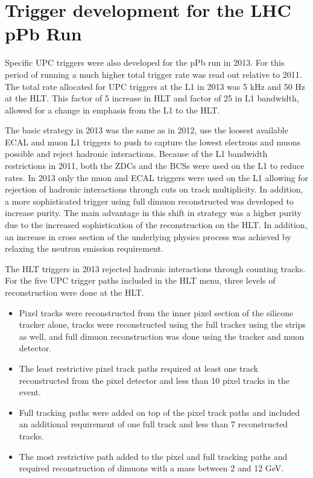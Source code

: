  \section{\label{sec:pPbTrigDev}Trigger development for the LHC pPb Run}
   Specific UPC triggers were also developed for the pPb run in 2013. 
    For this period of running a much higher total trigger rate was read out 
      relative to 2011.
    The total rate allocated for UPC triggers at the L1 in 2013 was 5 kHz and 
      50 Hz at the HLT.
    This factor of 5 increase in HLT and factor of 25 in L1 bandwidth,
      allowed for a change in emphasis from the L1 to the HLT. 

    The basic strategy in 2013 was the same as in 2012, use the loosest 
      available ECAL and muon L1 triggers to push to capture the lowest \pt{}
      electrons and muons possible and reject hadronic interactions.
    Because of the L1 bandwidth restrictions in 2011, both the ZDCs and the 
      BCSs were used on the L1 to reduce rates.
    In 2013 only the muon and ECAL triggers were used on the L1 allowing for 
      rejection of hadronic interactions through cuts on track multiplicity. 
    In addition, a more sophisticated trigger using full dimuon reconstructed 
      was developed to increase purity.
    The main advantage in this shift in strategy was a higher purity due to 
      the increased sophistication of the reconstruction on the HLT.
    In addition, an increase in cross section of the underlying physics process
      was achieved by relaxing the neutron emission requirement.

    The HLT triggers in 2013 rejected hadronic interactions through counting
      tracks. 
    For the five UPC trigger paths included in the HLT menu, 
      three levels of reconstruction were done at the HLT.

    \begin{itemize}
      \item Pixel tracks were reconstructed from the inner pixel section of the 
        silicone tracker alone, tracks were reconstructed using the full
        tracker using the strips as well, and full dimuon reconstruction was 
        done using the tracker and muon detector. 
      \item The least restrictive pixel track paths required at least 
        one track reconstructed from the pixel detector and less than 10 pixel 
        tracks in the event.
      \item Full tracking paths were added on top of the pixel track paths and included
        an additional requirement of one full track and less than 7 reconstructed
        tracks.
      \item The most restrictive path added to the pixel and full tracking paths and 
        required reconstruction of dimuons with a mass between 2 and 12 GeV.
    \end{itemize}


